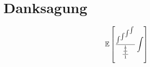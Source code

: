 
\chapter*{Danksagung}

\begin{equation}
\mathbb{E} \left[ \frac{\int^{\int^{\int^\int}}}{\frac{\frac{\frac{1}{1}}{1}}{1}}\int \right]
\end{equation}